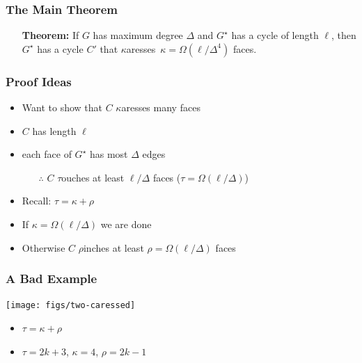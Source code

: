 \documentclass[xcolor=dvipsnames]{beamer}
\newcommand{\caresses}{$\kappa$aresses}
\newcommand{\dual}[1]{#1^\star}
\begin{document}
\begin{frame}
  \frametitle{The Main Theorem}

  \begin{itemize}
     \item[]\textbf{Theorem:} If $G$ has maximum degree $\Delta$ and $\dual{G}$ has a cycle of length $\ell$, then $\dual{G}$ has a cycle $C'$ that \caresses\ $\kappa=\Omega(\ell/\Delta^4)$ faces.
  \end{itemize}
\end{frame}

\begin{frame}
  \frametitle{Proof Ideas}
  
  \begin{itemize}[<+->]
     \item Want to show that $C$ $\kappa$aresses many faces
     \item $C$ has length $\ell$
     \item each face of $\dual{G}$ has most $\Delta$ edges
     \begin{itemize}[<+->]
       \item[$\therefore$] $C$ $\tau$ouches at least $\ell/\Delta$ faces
          ($\tau = \Omega(\ell/\Delta)$)
     \end{itemize}
     \item Recall: $\tau = \kappa + \rho$
     \item If $\kappa =\Omega(\ell/\Delta)$ we are done
     \item Otherwise $C$ $\rho$inches at least $\rho = \Omega(\ell/\Delta)$ faces
  \end{itemize}
\end{frame}


\begin{frame}
  \frametitle{A Bad Example}

  \begin{center}
     \texttt{[image: figs/two-caressed]}
  \end{center}
  \begin{itemize}
    \item $\tau = \kappa + \rho$
    \item $\tau = 2k+3$, $\kappa = 4$, $\rho = 2k-1$
  \end{itemize}
\end{frame}
\end{document}
